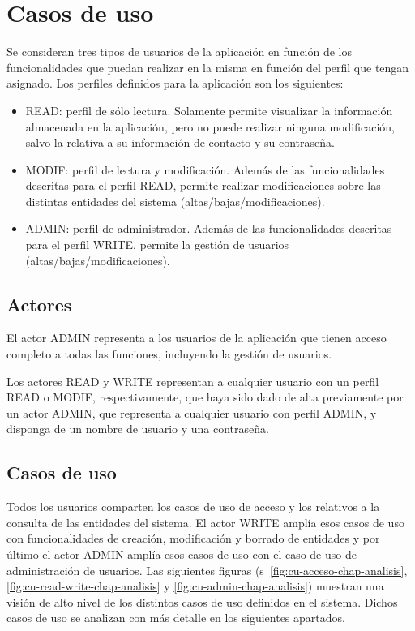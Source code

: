 \section{Casos de uso}
\label{sec:casos-uso-chap-analisis}

Se consideran tres tipos de usuarios de la aplicación en función de los funcionalidades que puedan realizar en la misma en función del perfil que tengan asignado. Los perfiles definidos para la aplicación son los siguientes:
\begin{itemize}
\item READ: perfil de sólo lectura. Solamente permite visualizar la información almacenada en la aplicación, pero no puede realizar ninguna modificación, salvo la relativa a su información de contacto y su contraseña.
\item MODIF: perfil de lectura y modificación. Además de las funcionalidades descritas para el perfil READ, permite realizar modificaciones sobre las distintas entidades del sistema (altas/bajas/modificaciones).
\item ADMIN: perfil de administrador. Además de las funcionalidades descritas para el perfil WRITE, permite la gestión de usuarios (altas/bajas/modificaciones).
\end{itemize}


\subsection{Actores}
\label{sub:actores-chap-analisis}

El actor ADMIN representa a los usuarios de la aplicación que tienen
acceso completo a todas las funciones, incluyendo la gestión de usuarios.

Los actores  READ y  WRITE representan a cualquier usuario con un perfil READ o MODIF, respectivamente, que haya sido dado de alta previamente por un actor ADMIN, que representa a cualquier usuario con perfil ADMIN, y disponga de un nombre de usuario y una contraseña.


\subsection{Casos de uso}
\label{sub:casos-uso-chap-analisis}


Todos los usuarios comparten los casos de uso de acceso y los relativos a la consulta de las entidades del sistema. El actor WRITE amplía esos casos de uso con funcionalidades de creación, modificación y borrado de entidades y por último el actor ADMIN amplía esos casos de uso con el caso de uso de administración de usuarios. Las siguientes figuras (\figurename{}s~\ref{fig:cu-acceso-chap-analisis}, \ref{fig:cu-read-write-chap-analisis} y \ref{fig:cu-admin-chap-analisis}) muestran una visión de alto nivel de los distintos casos de uso definidos en el sistema. Dichos casos de uso se analizan con más detalle en los siguientes apartados.


